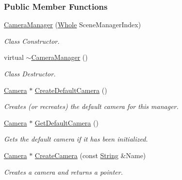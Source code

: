 \subsubsection*{Public Member Functions}
\begin{DoxyCompactItemize}
\item 
\hyperlink{classphys_1_1CameraManager_ae2d0ecf1130183393bb5c1e0b2d3169d}{CameraManager} (\hyperlink{namespacephys_a460f6bc24c8dd347b05e0366ae34f34a}{Whole} SceneManagerIndex)
\begin{DoxyCompactList}\small\item\em Class Constructor. \item\end{DoxyCompactList}\item 
virtual \hyperlink{classphys_1_1CameraManager_a0b0f032477309eb47b0302fd5eef198c}{$\sim$CameraManager} ()
\begin{DoxyCompactList}\small\item\em Class Destructor. \item\end{DoxyCompactList}\item 
\hyperlink{classphys_1_1Camera}{Camera} $\ast$ \hyperlink{classphys_1_1CameraManager_a80f7dd510a31264d74e7f5a53bdf86a9}{CreateDefaultCamera} ()
\begin{DoxyCompactList}\small\item\em Creates (or recreates) the default camera for this manager. \item\end{DoxyCompactList}\item 
\hyperlink{classphys_1_1Camera}{Camera} $\ast$ \hyperlink{classphys_1_1CameraManager_ad7ef5b6a4ca501729c2d5d107d1bf392}{GetDefaultCamera} ()
\begin{DoxyCompactList}\small\item\em Gets the default camera if it has been initialized. \item\end{DoxyCompactList}\item 
\hyperlink{classphys_1_1Camera}{Camera} $\ast$ \hyperlink{classphys_1_1CameraManager_a3681545c19a96ae62032204a6f4a602b}{CreateCamera} (const \hyperlink{namespacephys_aa03900411993de7fbfec4789bc1d392e}{String} \&Name)
\begin{DoxyCompactList}\small\item\em Creates a camera and returns a pointer. \item\end{DoxyCompactList}\item 

\end{DoxyCompactItemize}
